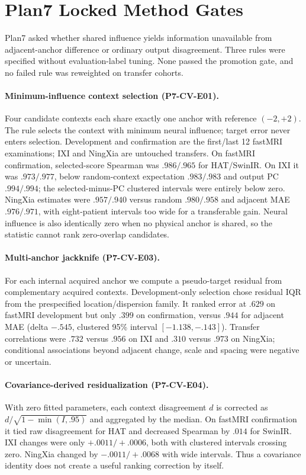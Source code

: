 \documentclass[10pt,twocolumn,letterpaper]{article}
\begin{document}
\section{Plan7 Locked Method Gates}
\label{sec:p7-gates}
Plan7 asked whether shared influence yields information unavailable from adjacent-anchor difference or ordinary output disagreement. Three rules were specified without evaluation-label tuning. None passed the promotion gate, and no failed rule was reweighted on transfer cohorts.

\paragraph{Minimum-influence context selection (P7-CV-E01).}
Four candidate contexts each share exactly one anchor with reference $(-2,+2)$. The rule selects the context with minimum neural influence; target error never enters selection. Development and confirmation are the first/last 12 fastMRI examinations; IXI and NingXia are untouched transfers. On fastMRI confirmation, selected-score Spearman was $.986/.965$ for HAT/SwinIR. On IXI it was $.973/.977$, below random-context expectation $.983/.983$ and output PC $.994/.994$; the selected-minus-PC clustered intervals were entirely below zero. NingXia estimates were $.957/.940$ versus random $.980/.958$ and adjacent MAE $.976/.971$, with eight-patient intervals too wide for a transferable gain. Neural influence is also identically zero when no physical anchor is shared, so the statistic cannot rank zero-overlap candidates.

\paragraph{Multi-anchor jackknife (P7-CV-E03).}
For each internal acquired anchor we compute a pseudo-target residual from complementary acquired contexts. Development-only selection chose residual IQR from the prespecified location/dispersion family. It ranked error at $.629$ on fastMRI development but only $.399$ on confirmation, versus $.944$ for adjacent MAE (delta $-.545$, clustered 95\% interval $[-1.138,-.143]$). Transfer correlations were $.732$ versus $.956$ on IXI and $.310$ versus $.973$ on NingXia; conditional associations beyond adjacent change, scale and spacing were negative or uncertain.

\paragraph{Covariance-derived residualization (P7-CV-E04).}
With zero fitted parameters, each context disagreement $d$ is corrected as $d/\sqrt{1-\min(I,.95)}$ and aggregated by the median. On fastMRI confirmation it tied raw disagreement for HAT and decreased Spearman by $.014$ for SwinIR. IXI changes were only $+.0011/+.0006$, both with clustered intervals crossing zero. NingXia changed by $-.0011/+.0068$ with wide intervals. Thus a covariance identity does not create a useful ranking correction by itself.
\end{document}
